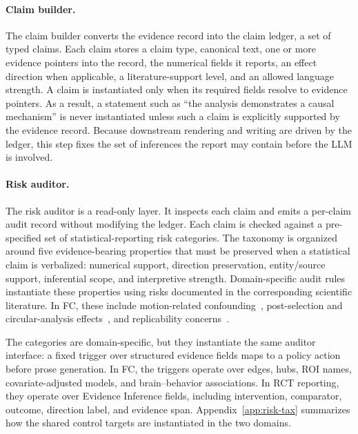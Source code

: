 \documentclass[10pt,twocolumn]{article}
\begin{document}
\paragraph{Claim builder.}
The claim builder converts the evidence record into the claim ledger, a set of typed claims. Each claim stores a claim type, canonical text, one or more evidence pointers into the record, the numerical fields it reports, an effect direction when applicable, a literature-support level, and an allowed language strength. A claim is instantiated only when its required fields resolve to evidence pointers. As a result, a statement such as ``the analysis demonstrates a causal mechanism'' is never instantiated unless such a claim is explicitly supported by the evidence record. Because downstream rendering and writing are driven by the ledger, this step fixes the set of inferences the report may contain before the LLM is involved.

\paragraph{Risk auditor.}
The risk auditor is a read-only layer. It inspects each claim and emits a per-claim audit record without modifying the ledger. Each claim is checked against a pre-specified set of statistical-reporting risk categories. The taxonomy is organized around five evidence-bearing properties that must be preserved when a statistical claim is verbalized: numerical support, direction preservation, entity/source support, inferential scope, and interpretive strength. Domain-specific audit rules instantiate these properties using risks documented in the corresponding scientific literature. In FC, these include motion-related confounding~\citep{ref_power}, post-selection and circular-analysis effects~\citep{ref_vul,ref_kriegeskorte}, and replicability concerns~\citep{ref_marek,ref_narps}.

The categories are domain-specific, but they instantiate the same auditor interface: a fixed trigger over structured evidence fields maps to a policy action before prose generation. In FC, the triggers operate over edges, hubs, ROI names, covariate-adjusted models, and brain--behavior associations. In RCT reporting, they operate over Evidence Inference fields, including intervention, comparator, outcome, direction label, and evidence span. Appendix~\ref{app:risk-tax} summarizes how the shared control targets are instantiated in the two domains.
\end{document}
